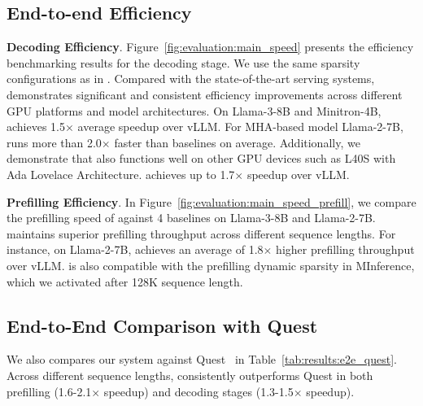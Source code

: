 



\subsection{End-to-end Efficiency}

\textbf{Decoding Efficiency}. Figure~\ref{fig:evaluation:main_speed} presents the efficiency benchmarking results for the decoding stage. We use the same sparsity configurations as in . Compared with the state-of-the-art serving systems, \system demonstrates significant and consistent efficiency improvements across different GPU platforms and model architectures. On Llama-3-8B and Minitron-4B, \system achieves 1.5$\times$ average speedup over vLLM. For MHA-based model Llama-2-7B, \system runs more than 2.0$\times$ faster than baselines on average. Additionally, we demonstrate that \system also functions well on other GPU devices such as L40S with Ada Lovelace Architecture. \system achieves up to 1.7$\times$ speedup over vLLM.

\textbf{Prefilling Efficiency}. In Figure~\ref{fig:evaluation:main_speed_prefill}, we compare the prefilling speed of \system against 4 baselines on Llama-3-8B and Llama-2-7B. \system maintains superior prefilling throughput across different sequence lengths. For instance, on Llama-2-7B, \system achieves an average of 1.8$\times$ higher prefilling throughput over vLLM. \system is also compatible with the prefilling dynamic sparsity in MInference, which we activated after 128K sequence length. 



\subsection{End-to-End Comparison with Quest}

We also compares our system against Quest~\cite{tang2024quest} in Table~\ref{tab:results:e2e_quest}. Across different sequence lengths, \system consistently outperforms Quest in both prefilling (1.6-2.1$\times$ speedup) and decoding stages (1.3-1.5$\times$ speedup). 

